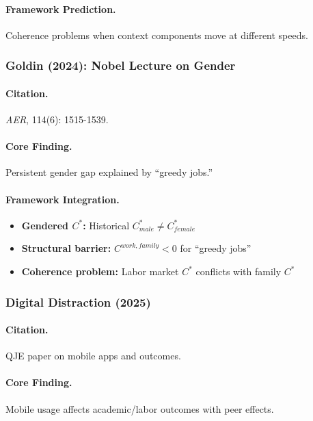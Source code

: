 \documentclass[12pt,a4paper]{article}
\begin{document}
\paragraph{Framework Prediction.}
Coherence problems when context components move at different speeds.

\subsubsection{Goldin (2024): Nobel Lecture on Gender}

\paragraph{Citation.}
\emph{AER}, 114(6): 1515-1539.

\paragraph{Core Finding.}
Persistent gender gap explained by ``greedy jobs.''

\paragraph{Framework Integration.}
\begin{itemize}
  \item \textbf{Gendered $C^*$:} Historical $C^*_{male} \neq C^*_{female}$
  \item \textbf{Structural barrier:} $C^{work,family} < 0$ for ``greedy jobs''
  \item \textbf{Coherence problem:} Labor market $C^*$ conflicts with family $C^*$
\end{itemize}

\subsubsection{Digital Distraction (2025)}

\paragraph{Citation.}
QJE paper on mobile apps and outcomes.

\paragraph{Core Finding.}
Mobile usage affects academic/labor outcomes with peer effects.
\end{document}
